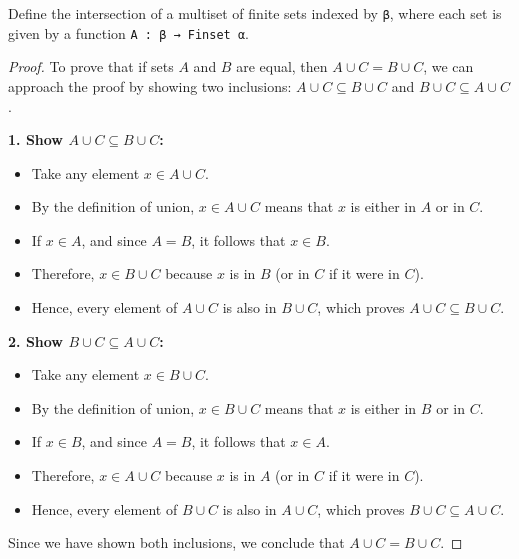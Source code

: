 \begin{definition}\label{Multiset.FinInter}
  \leanok
  Define the intersection of a multiset of finite sets indexed by \verb|β|, where each set is given by a function \verb|A : β → Finset α|.
\end{definition}

\begin{proof}
  \leanok
  To prove that if sets \( A \) and \( B \) are equal, then \( A \cup C = B \cup C \), we can approach the proof by showing two inclusions: \( A \cup C \subseteq B \cup C \) and \( B \cup C \subseteq A \cup C \).

  \textbf{1. Show \( A \cup C \subseteq B \cup C \):}

  \begin{itemize}
    \item Take any element \( x \in A \cup C \).
    \item By the definition of union, \( x \in A \cup C \) means that \( x \) is either in \( A \) or in \( C \).
    \item If \( x \in A \), and since \( A = B \), it follows that \( x \in B \).
    \item Therefore, \( x \in B \cup C \) because \( x \) is in \( B \) (or in \( C \) if it were in \( C \)).
    \item Hence, every element of \( A \cup C \) is also in \( B \cup C \), which proves \( A \cup C \subseteq B \cup C \).
  \end{itemize}

  \textbf{2. Show \( B \cup C \subseteq A \cup C \):}

  \begin{itemize}
    \item Take any element \( x \in B \cup C \).
    \item By the definition of union, \( x \in B \cup C \) means that \( x \) is either in \( B \) or in \( C \).
    \item If \( x \in B \), and since \( A = B \), it follows that \( x \in A \).
    \item Therefore, \( x \in A \cup C \) because \( x \) is in \( A \) (or in \( C \) if it were in \( C \)).
    \item Hence, every element of \( B \cup C \) is also in \( A \cup C \), which proves \( B \cup C \subseteq A \cup C \).
  \end{itemize}

  Since we have shown both inclusions, we conclude that \( A \cup C = B \cup C \).
\end{proof}

